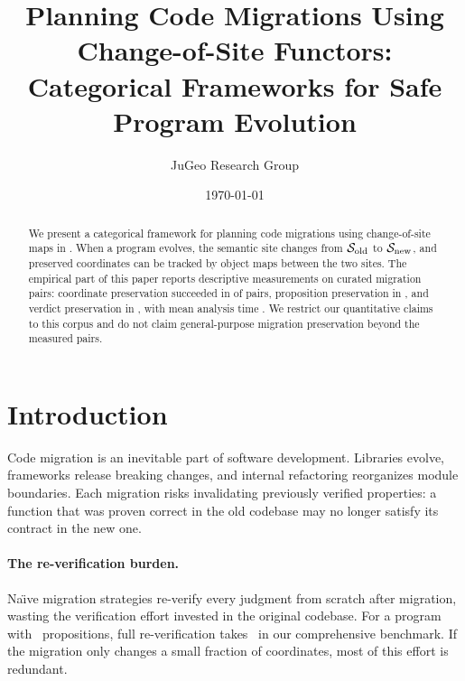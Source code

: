 \documentclass[11pt]{article}
\title{\textbf{Planning Code Migrations Using Change-of-Site Functors:\\
Categorical Frameworks for Safe Program Evolution}}
\author{%
  JuGeo Research Group
}
\date{\today}
\newcommand{\SiteOld}{\Site_{\mathrm{old}}}
\newcommand{\SiteNew}{\Site_{\mathrm{new}}}
\begin{document}
\maketitle

\begin{abstract}
We present a categorical framework for planning code migrations using
change-of-site maps in \JuGeo. When a program evolves, the semantic site
changes from $\SiteOld$ to $\SiteNew$, and preserved coordinates can be
tracked by object maps between the two sites. The empirical part of this
paper reports descriptive measurements on \ppLXIIIpairCount{} curated
migration pairs: coordinate preservation succeeded in
\ppLXIIIcoordPreservedPct{} of pairs, proposition preservation in
\ppLXIIIpropsPreservedPct{}, and verdict preservation in
\ppLXIIIverdictPreservedPct{}, with mean analysis time
\ppLXIIItimeMean{}. We restrict our quantitative claims to this corpus and do
not claim general-purpose migration preservation beyond the measured pairs.
\end{abstract}

\newpage

\section{Introduction}\label{sec:intro}

Code migration is an inevitable part of software development.  Libraries
evolve, frameworks release breaking changes, and internal refactoring
reorganizes module boundaries.  Each migration risks invalidating previously
verified properties: a function that was proven correct in the old codebase
may no longer satisfy its contract in the new one.

\paragraph{The re-verification burden.}
Na\"{\i}ve migration strategies re-verify every judgment from scratch after
migration, wasting the verification effort invested in the original
codebase.  For a program with \compPropsSum\ propositions, full
re-verification takes \compTimeTotal\ in our comprehensive benchmark.  If
the migration only changes a small fraction of coordinates, most of this
effort is redundant.
\end{document}
